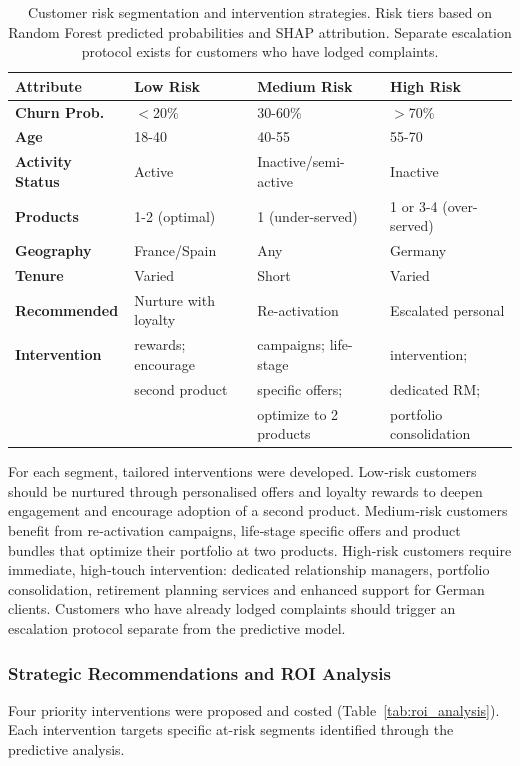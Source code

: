 \documentclass[12pt]{article}
\begin{document}
\begin{table}[H]
\centering
\small
\caption{Customer risk segmentation and intervention strategies. Risk tiers based on Random Forest predicted probabilities and SHAP attribution. Separate escalation protocol exists for customers who have lodged complaints.}
\label{tab:risk_profiles}
\begin{tabular}{p{3.5cm}p{3.5cm}p{3.5cm}p{3.5cm}}
\toprule
\textbf{Attribute} & \textbf{Low Risk} & \textbf{Medium Risk} & \textbf{High Risk} \\
\midrule
\rowcolor{gray!8}\textbf{Churn Prob.} & $<$20\% & 30-60\% & $>$70\% \\
\textbf{Age} & 18-40 & 40-55 & 55-70 \\
\rowcolor{gray!8}\textbf{Activity Status} & Active & Inactive/semi-active & Inactive \\
\textbf{Products} & 1-2 (optimal) & 1 (under-served) & 1 or 3-4 (over-served) \\
\rowcolor{gray!8}\textbf{Geography} & France/Spain & Any & Germany \\
\textbf{Tenure} & Varied & Short & Varied \\
\midrule
\textbf{Recommended} & Nurture with loyalty & Re-activation & Escalated personal \\
\textbf{Intervention} & rewards; encourage & campaigns; life-stage & intervention; \\
& second product & specific offers; & dedicated RM; \\
& & optimize to 2 products & portfolio consolidation \\
\bottomrule
\end{tabular}
\end{table}

For each segment, tailored interventions were developed.  Low‑risk customers should be nurtured through personalised offers and loyalty rewards to deepen engagement and encourage adoption of a second product.  Medium‑risk customers benefit from re‑activation campaigns, life‑stage specific offers and product bundles that optimize their portfolio at two products.  High‑risk customers require immediate, high‑touch intervention: dedicated relationship managers, portfolio consolidation, retirement planning services and enhanced support for German clients.  Customers who have already lodged complaints should trigger an escalation protocol separate from the predictive model.

\subsubsection{Strategic Recommendations and ROI Analysis}
Four priority interventions were proposed and costed (Table~\ref{tab:roi_analysis}).  Each intervention targets specific at-risk segments identified through the predictive analysis.
\end{document}
